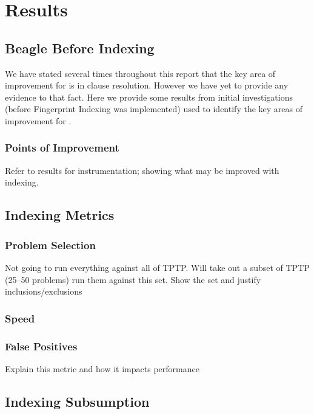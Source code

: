 
\chapter{Results}
\label{cha:results}

\section{Beagle Before Indexing}
\label{sec:preindexing}

We have stated several times throughout this report that the key area of improvement for \beagle
is in clause resolution. However we have yet to provide any evidence to that fact.
Here we provide some results from initial investigations (before Fingerprint Indexing
was implemented) used to identify the key areas of improvement for \beagle.

\subsection{Points of Improvement}
\label{section:instr}

Refer to results for instrumentation; showing what may be improved with indexing.

\section{Indexing Metrics}
\label{sec:metrics}

\subsection{Problem Selection}
Not going to run everything against all of TPTP. Will take out a subset
of TPTP (25--50 problems) run them against this set.
Show the set and justify inclusions/exclusions

\subsection{Speed}

\subsection{False Positives}
Explain this metric and how it impacts performance

\section{Indexing Subsumption}
\label{sec:indexresults}

